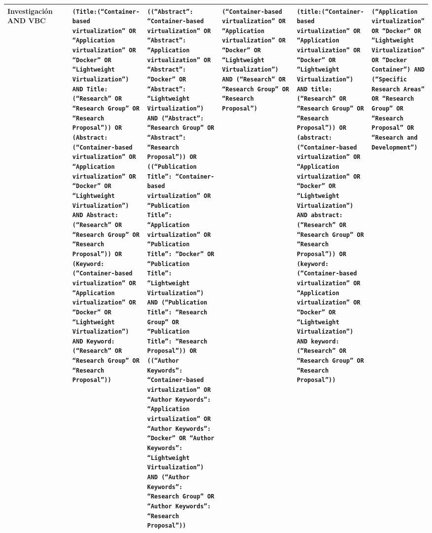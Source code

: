 \begin{table}
\begin{adjustbox}{max width=\textwidth}
\begin{tabular}{|P{0.18\linewidth}|P{0.20\linewidth}|P{0.20\linewidth}|P{0.20\linewidth}|P{0.20\linewidth}|P{0.20\linewidth}|}
\hline
\textbf{Investigación AND VBC}
& \tiny \texttt{(Title:(``Container-based virtualization'' OR ``Application virtualization'' OR ``Docker'' OR ``Lightweight Virtualization'') AND Title:(``Research'' OR ``Research Group'' OR ``Research Proposal'')) OR (Abstract:(``Container-based virtualization'' OR ``Application virtualization'' OR ``Docker'' OR ``Lightweight Virtualization'') AND Abstract:(``Research'' OR ``Research Group'' OR ``Research Proposal'')) OR (Keyword:(``Container-based virtualization'' OR ``Application virtualization'' OR ``Docker'' OR ``Lightweight Virtualization'') AND Keyword:(``Research'' OR ``Research Group'' OR ``Research Proposal''))} 
& \tiny \texttt{((``Abstract'': ``Container-based virtualization'' OR ``Abstract'': ``Application virtualization'' OR ``Abstract'': ``Docker'' OR ``Abstract'': ``Lightweight Virtualization'') AND (``Abstract'': ``Research Group'' OR ``Abstract'': ``Research Proposal'')) OR ((``Publication Title'': ``Container-based virtualization'' OR ``Publication Title'': ``Application virtualization'' OR ``Publication Title'': ``Docker'' OR ``Publication Title'': ``Lightweight Virtualization'') AND (``Publication Title'': ``Research Group'' OR ``Publication Title'': ``Research Proposal'')) OR ((``Author Keywords'': ``Container-based virtualization'' OR ``Author Keywords'': ``Application virtualization'' OR ``Author Keywords'': ``Docker'' OR ``Author Keywords'': ``Lightweight Virtualization'') AND (``Author Keywords'': ``Research Group'' OR ``Author Keywords'': ``Research Proposal''))} 
& \tiny \texttt{(``Container-based virtualization'' OR ``Application virtualization'' OR ``Docker'' OR ``Lightweight Virtualization'') AND (``Research'' OR ``Research Group'' OR ``Research Proposal'')} 
& \tiny \texttt{(title:(``Container-based virtualization'' OR ``Application virtualization'' OR ``Docker'' OR ``Lightweight Virtualization'') AND title:(``Research'' OR ``Research Group'' OR ``Research Proposal'')) OR (abstract:(``Container-based virtualization'' OR ``Application virtualization'' OR ``Docker'' OR ``Lightweight Virtualization'') AND abstract:(``Research'' OR ``Research Group'' OR ``Research Proposal'')) OR (keyword:(``Container-based virtualization'' OR ``Application virtualization'' OR ``Docker'' OR ``Lightweight Virtualization'') AND keyword:(``Research'' OR ``Research Group'' OR ``Research Proposal''))} 
& \tiny \texttt{(``Application virtualization'' OR ``Docker'' OR ``Lightweight Virtualization'' OR ``Docker Container'') AND (``Specific Research Areas'' OR ``Research Group'' OR ``Research Proposal'' OR ``Research and Development'')} \\
\hline


\end{tabular}
\end{adjustbox}
\end{table}
